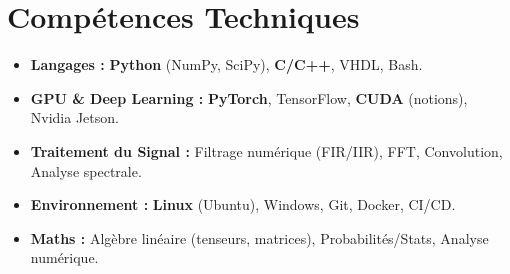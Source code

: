 \documentclass[a4paper,11pt]{article}
\begin{document}
\section{Compétences Techniques}
\begin{itemize}[leftmargin=*, nosep]
    \item \small{\textbf{Langages :} \textbf{Python} (NumPy, SciPy), \textbf{C/C++}, VHDL, Bash.}
    \item \small{\textbf{GPU \& Deep Learning :} \textbf{PyTorch}, TensorFlow, \textbf{CUDA} (notions), Nvidia Jetson.}
    \item \small{\textbf{Traitement du Signal :} Filtrage numérique (FIR/IIR), FFT, Convolution, Analyse spectrale.}
    \item \small{\textbf{Environnement :} \textbf{Linux} (Ubuntu), Windows, Git, Docker, CI/CD.}
    \item \small{\textbf{Maths :} Algèbre linéaire (tenseurs, matrices), Probabilités/Stats, Analyse numérique.}
\end{itemize}

\end{document}
